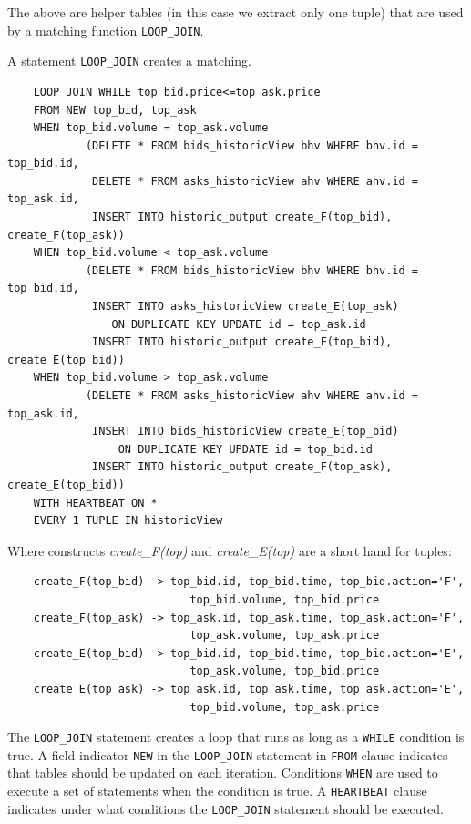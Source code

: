 \documentclass{article}
\begin{document}
The above are helper tables (in this case we extract only one tuple) that are used by a matching function {\tt LOOP\_JOIN}.

A statement {\tt LOOP\_JOIN} creates a matching. 

\begin{verbatim}  
    LOOP_JOIN WHILE top_bid.price<=top_ask.price
    FROM NEW top_bid, top_ask
    WHEN top_bid.volume = top_ask.volume 
            (DELETE * FROM bids_historicView bhv WHERE bhv.id = top_bid.id,
             DELETE * FROM asks_historicView ahv WHERE ahv.id = top_ask.id,
             INSERT INTO historic_output create_F(top_bid), create_F(top_ask))
    WHEN top_bid.volume < top_ask.volume 
            (DELETE * FROM bids_historicView bhv WHERE bhv.id = top_bid.id,
             INSERT INTO asks_historicView create_E(top_ask) 
                ON DUPLICATE KEY UPDATE id = top_ask.id
             INSERT INTO historic_output create_F(top_bid), create_E(top_bid))
    WHEN top_bid.volume > top_ask.volume 
            (DELETE * FROM asks_historicView ahv WHERE ahv.id = top_ask.id,
             INSERT INTO bids_historicView create_E(top_bid) 
                 ON DUPLICATE KEY UPDATE id = top_bid.id
             INSERT INTO historic_output create_F(top_ask), create_E(top_bid))
    WITH HEARTBEAT ON *
    EVERY 1 TUPLE IN historicView
\end{verbatim}

\noindent Where constructs \emph{create\_F(top)} and \emph{create\_E(top)} are a short hand for tuples:

\begin{verbatim}
    create_F(top_bid) -> top_bid.id, top_bid.time, top_bid.action='F',
                            top_bid.volume, top_bid.price
    create_F(top_ask) -> top_ask.id, top_ask.time, top_ask.action='F',
                            top_ask.volume, top_ask.price
    create_E(top_bid) -> top_bid.id, top_bid.time, top_bid.action='E',
                            top_ask.volume, top_bid.price
    create_E(top_ask) -> top_ask.id, top_ask.time, top_ask.action='E',
                            top_bid.volume, top_ask.price
\end{verbatim}

The {\tt LOOP\_JOIN} statement creates a loop that runs as long as a {\tt WHILE} condition is true. A field indicator {\tt NEW} in the {\tt LOOP\_JOIN} statement in {\tt FROM} clause indicates that tables should be updated on each iteration. Conditions {\tt WHEN} are used to execute a set of statements when the condition is true. A {\tt HEARTBEAT} clause indicates under what conditions the {\tt LOOP_JOIN} statement should be executed. 
\end{document}
